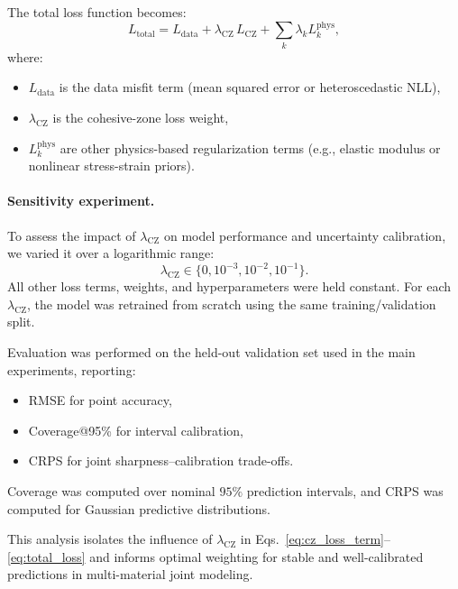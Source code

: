 \documentclass{article}
\begin{document}
The total loss function becomes:
\begin{equation}
    L_{\mathrm{total}} = L_{\mathrm{data}} + \lambda_{\mathrm{CZ}} \, L_{\mathrm{CZ}} + \sum_{k} \lambda_k L_k^{\mathrm{phys}},
    \label{eq:total_loss}
\end{equation}
where:
\begin{itemize}
    \item $L_{\mathrm{data}}$ is the data misfit term (mean squared error or heteroscedastic NLL),
    \item $\lambda_{\mathrm{CZ}}$ is the cohesive-zone loss weight,
    \item $L_k^{\mathrm{phys}}$ are other physics-based regularization terms (e.g., elastic modulus or nonlinear stress-strain priors).
\end{itemize}

\paragraph{Sensitivity experiment.}
To assess the impact of $\lambda_{\mathrm{CZ}}$ on model performance and uncertainty calibration, we varied it over a logarithmic range:
\[
\lambda_{\mathrm{CZ}} \in \{0, 10^{-3}, 10^{-2}, 10^{-1}\}.
\]
All other loss terms, weights, and hyperparameters were held constant.
For each $\lambda_{\mathrm{CZ}}$, the model was retrained from scratch using the same training/validation split.

Evaluation was performed on the held-out validation set used in the main experiments, reporting:
\begin{itemize}
    \item RMSE for point accuracy,
    \item Coverage@95\% for interval calibration,
    \item CRPS for joint sharpness–calibration trade-offs.
\end{itemize}
Coverage was computed over nominal $95\%$ prediction intervals, and CRPS was computed for Gaussian predictive distributions.

This analysis isolates the influence of $\lambda_{\mathrm{CZ}}$ in Eqs.~\ref{eq:cz_loss_term}--\ref{eq:total_loss} and informs optimal weighting for stable and well-calibrated predictions in multi-material joint modeling.
\end{document}
